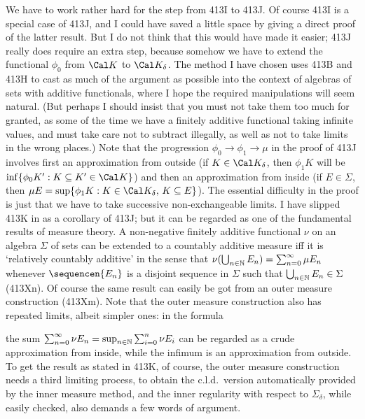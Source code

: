 {We have to work rather hard for the step from 413I to 413J.   Of course
413I is a special case of 413J, and I could have saved a little space by
giving a direct proof of the latter result.   But I do not think that
this would have made it easier;  413J really does require an extra step,
because somehow we have to extend the functional $\phi_0$ from $\Cal K$
to $\Cal K_{\delta}$.   The method I have chosen uses 413B and 413H to
cast as much of the argument as possible into the context of algebras of
sets with additive functionals, where I hope the required manipulations
will seem natural.   (But perhaps I should insist that you must not take
them too much
for granted, as some of the time we have a finitely additive
functional taking infinite values, and must take care not to
subtract illegally, as well as not to take limits in the wrong places.)
Note that the progression $\phi_0\to\phi_1\to\mu$ in the proof of 413J
involves first an approximation from outside (if $K\in\Cal K_{\delta}$,
then $\phi_1K$ will be $\inf\{\phi_0K':K\subseteq K'\in\Cal K\}$) and
then an approximation from inside (if $E\in\Sigma$, then $\mu
E=\sup\{\phi_1K:K\in\Cal K_{\delta},\,K\subseteq E\}$).   The essential
difficulty in the proof is just that we have to take successive
non-exchangeable limits.
I have slipped 413K in as a corollary of 413J;  but it can be regarded
as one of the fundamental results of measure theory.   A non-negative
finitely additive functional $\nu$ on an algebra $\Sigma$ of sets can be
extended to
a countably additive measure iff it is `relatively countably additive'
in the sense
that $\nu(\bigcup_{n\in\Bbb N}E_n)=\sum_{n=0}^{\infty}\mu E_n$ whenever
$\sequencen{E_n}$ is a disjoint sequence in $\Sigma$ such that
$\bigcup_{n\in\Bbb N}E_n\in\Sigma$ (413Xn).   Of course the same result
can easily be got from an outer measure construction (413Xm).   Note
that the outer measure construction also has repeated limits, albeit
simpler ones:  in the formula


\noindent the sum $\sum_{n=0}^{\infty}\nu E_n=\sup_{n\in\Bbb
N}\sum_{i=0}^n\nu E_i$ can be regarded as a crude approximation from
inside, while the infimum
is an approximation from outside.   To get the result as stated in 413K,
of course, the outer measure construction needs a third limiting
process, to
obtain the c.l.d.\ version automatically provided by the inner measure
method, and the inner regularity with respect to $\Sigma_{\delta}$,
while easily checked, also demands a few words of argument.

}
